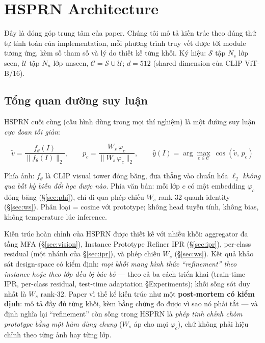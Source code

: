 \documentclass[10pt,twocolumn,letterpaper]{article}
\newcommand{\Seen}{\mathcal{S}}
\newcommand{\Unseen}{\mathcal{U}}
\newcommand{\All}{\mathcal{C}}
\newcommand{\vtilde}{\tilde{v}}
\begin{document}
\section{HSPRN Architecture}
\label{sec:arch}

Đây là đóng góp trung tâm của paper. Chúng tôi mô tả kiến trúc theo đúng thứ tự tính toán của implementation, mỗi phương trình truy vết được tới module tương ứng, kèm số tham số và lý do thiết kế từng khối. Ký hiệu: $\Seen$ tập $N_s$ lớp seen, $\Unseen$ tập $N_u$ lớp unseen, $\All=\Seen\cup\Unseen$; $d{=}512$ (shared dimension của CLIP ViT-B/16).

\subsection{Tổng quan đường suy luận}
\label{sec:overview}

HSPRN cuối cùng (cấu hình dùng trong mọi thí nghiệm) là một đường suy luận \emph{cực đoan tối giản}:

\begin{equation}
\vtilde = \frac{f_\theta(I)}{\|f_\theta(I)\|_2},
\qquad
p_c = \frac{W_s\,\varphi_c}{\|W_s\,\varphi_c\|_2},
\qquad
\hat y(I) = \arg\max_{c\in\All}\ \cos(\vtilde,\,p_c)
\label{eq:pipeline}
\end{equation}

Phía ảnh: $f_\theta$ là CLIP visual tower đóng băng, đưa thẳng vào chuẩn hóa $\ell_2$ \emph{không qua bất kỳ biến đổi học được nào}. Phía văn bản: mỗi lớp $c$ có một embedding $\varphi_c$ đóng băng (§\ref{sec:phi}), chỉ đi qua phép chiếu $W_s$ rank-32 quanh identity (§\ref{sec:ws}). Phân loại = cosine với prototype; không head tuyến tính, không bias, không temperature lúc inference.

Kiến trúc hoàn chỉnh của HSPRN được thiết kế với nhiều khối: aggregator đa tầng MFA (§\ref{sec:vision}), Instance Prototype Refiner IPR (§\ref{sec:ipr}), per-class residual (một nhánh của §\ref{sec:ipr}), và phép chiếu $W_s$ (§\ref{sec:ws}). Kết quả khảo sát design-space có kiểm định: \emph{mọi khối mang hình thức ``refinement'' theo instance hoặc theo lớp đều bị bác bỏ} — theo cả ba cách triển khai (train-time IPR, per-class residual, test-time adaptation §Experiments); khối sống sót duy nhất là $W_s$ rank-32. Paper vì thế kể kiến trúc như một \textbf{post-mortem có kiểm định}: mô tả đầy đủ từng khối, kèm bằng chứng đo được vì sao nó phải tắt — và định nghĩa lại ``refinement'' còn sống trong HSPRN là \emph{phép tinh chỉnh chòm prototype bằng một hàm dùng chung} ($W_s$ áp cho mọi $\varphi_c$), chứ không phải hiệu chỉnh theo từng ảnh hay từng lớp.
\end{document}
